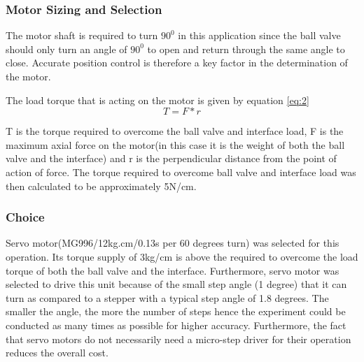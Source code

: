 \subsubsection{Motor Sizing and Selection}
\par
The motor shaft is required to turn $90^{0}$ in this application since the ball valve should only turn an angle of $90^{0}$ to open and return through the same angle to close. Accurate position control is therefore a key factor in the determination of the motor.
\par
The load torque that is acting on the motor is given by equation \ref{eq:2}
\begin{equation}
T=  F * r
\label{eq:2}
\end{equation}
\par
T is the torque required to overcome the ball valve and interface load, F is the maximum axial force on the motor(in this case it is the weight of both the ball valve and the interface) and r is the perpendicular distance from the point of action of force. The torque required to overcome ball valve and interface load was then calculated to be  approximately 5N/cm.

\subsubsection{Choice}
\par
Servo motor(MG996/12kg.cm/0.13s per 60 degrees turn) was selected for this operation. Its torque supply of 3kg/cm is above the required to overcome the load torque of both the ball valve and the interface. Furthermore, servo motor was selected to drive this unit because of the small step angle (1 degree) that it can turn as compared to a stepper with a typical step angle of 1.8 degrees. The smaller the angle, the more the number of steps hence the experiment could be conducted as many times as possible for higher accuracy. Furthermore, the fact that servo motors do not necessarily need a micro-step driver for their operation reduces the overall cost.

